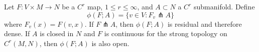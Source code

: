 Let $F: V \times M \to N$ be a $C^r$ map, $1 \leqslant r \leqslant \infty$, and $A \subset N$ a $C^r$ submanifold. Define
$$\phi(F; A) = \{v \in V : F_v \pitchfork A\}$$
where $F_v(x) = F(v,x)$. If $F \pitchfork A$, then $\phi(F; A)$ is residual and therefore dense. If $A$ is closed in $N$ and $F$ is continuous for the strong topology on $C^r(M,N)$, then $\phi(F; A)$ is also open.
